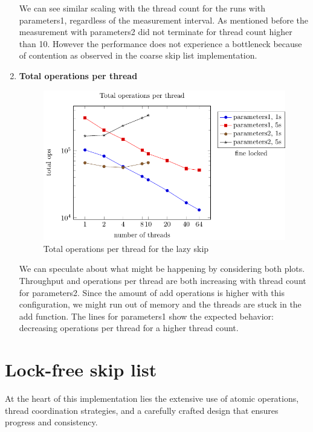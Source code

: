 \documentclass{article}
\begin{document}
\begin{enumerate}
\begin{figure}[H]
        \label{fig:fine_skiplist_throughput}
    \end{figure}
    We can see similar scaling with the thread count for the runs with parameters1, regardless of the measurement interval. As mentioned before the measurement with parameters2 did not terminate for thread count higher than 10.
    However the performance does not experience a bottleneck because of contention as observed in the coarse skip list implementation.
    \item \textbf{Total operations per thread}
    \begin{figure}[H]
        \centering
        \includegraphics{../plots/fine_per_thread.pdf}
        \caption{ Total operations per thread for the lazy skip}       
        \label{fig:fine_skiplist_per_thread}
    \end{figure}
    We can speculate about what might be happening by considering both plots. Throughput and operations per thread are both increasing with thread count for parameters2. Since the amount of add operations is higher with this configuration, we might run out of memory and the threads are stuck in the add function.
    The lines for parameters1 show the expected behavior: decreasing operations per thread for a higher thread count.
\end{enumerate}

\newpage

\section{Lock-free skip list}
At the heart of this implementation lies the extensive use of atomic operations, thread coordination strategies, and a carefully crafted design that ensures progress and consistency.
\end{document}
